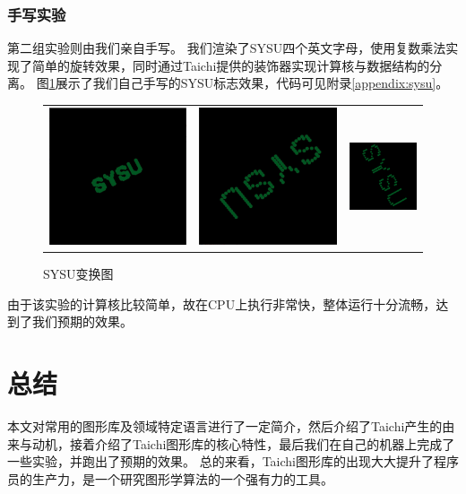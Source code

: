 \documentclass[thesis]{thesis}
\begin{document}
\subsubsection{手写实验}
第二组实验则由我们亲自手写。
我们渲染了SYSU四个英文字母，使用复数乘法实现了简单的旋转效果，同时通过Taichi提供的装饰器实现计算核与数据结构的分离。
图\ref{fig:sysu}展示了我们自己手写的SYSU标志效果，代码可见附录\ref{appendix:sysu}。
\begin{figure}[!ht]
\centering
\begin{tabular}{ccc}
\includegraphics[width=0.33\linewidth]{fig/sysu1.jpg}&
\includegraphics[width=0.33\linewidth]{fig/sysu2.jpg}&
\includegraphics[width=0.33\linewidth]{fig/sysu3.png}
\end{tabular}
\caption{SYSU变换图}
\label{fig:sysu}
\end{figure}

由于该实验的计算核比较简单，故在CPU上执行非常快，整体运行十分流畅，达到了我们预期的效果。

\section{总结}
\label{sec:summary}
本文对常用的图形库及领域特定语言进行了一定简介，然后介绍了Taichi产生的由来与动机，接着介绍了Taichi图形库的核心特性，最后我们在自己的机器上完成了一些实验，并跑出了预期的效果。
总的来看，Taichi图形库的出现大大提升了程序员的生产力，是一个研究图形学算法的一个强有力的工具。
\end{document}
